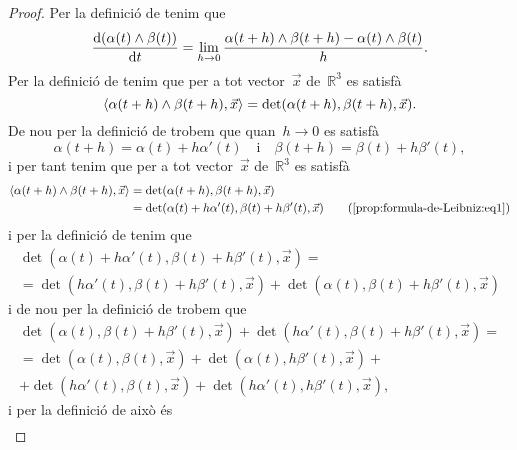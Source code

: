 \documentclass[../../main.tex]{subfiles}
\begin{document}
    \begin{proof}
        Per la definició de  tenim que
        \begin{equation}
            \label{prop:formula-de-Leibniz:eq2}
            \frac{\mathop{}\!\mathrm{d}(\alpha(t)\mathbin{\wedge}\beta(t))}{\mathop{}\!\mathrm{d} t}=\lim_{h\to0}\frac{\alpha(t+h)\mathbin{\wedge}\beta(t+h)-\alpha(t)\mathbin{\wedge}\beta(t)}{h}.
        \end{equation}
        Per la definició de  tenim que per a tot vector~\(\vec{x}\) de~\(\mathbb{R}^{3}\) es satisfà
        \[
            \prodesc{\alpha(t+h)\prodvec\beta(t+h)}{\vec{x}}=\det(\alpha(t+h),\beta(t+h),\vec{x}).
        \]
        De nou per la definició de  trobem que quan~\(h\to0\) es satisfà
        \begin{equation}
            \label{prop:formula-de-Leibniz:eq1}
            \alpha(t+h)=\alpha(t)+h\alpha'(t)\quad\text{i}\quad\beta(t+h)=\beta(t)+h\beta'(t),
        \end{equation}
        i per tant tenim que per a tot vector~\(\vec{x}\) de~\(\mathbb{R}^{3}\) es satisfà
        \begin{align*}
            \prodesc{\alpha(t+h)\prodvec\beta(t+h)}{\vec{x}}&=\det(\alpha(t+h),\beta(t+h),\vec{x}) \\
            &=\det(\alpha(t)+h\alpha'(t),\beta(t)+h\beta'(t),\vec{x}) \tag{\ref{prop:formula-de-Leibniz:eq1}}
        \end{align*}
        i per la definició de  tenim que
        \begin{multline*}
            \det(\alpha(t)+h\alpha'(t),\beta(t)+h\beta'(t),\vec{x})=\\
            =\det(h\alpha'(t),\beta(t)+h\beta'(t),\vec{x})+\det(\alpha(t),\beta(t)+h\beta'(t),\vec{x})
        \end{multline*}
        i de nou per la definició de  trobem que
        \begin{multline*}
            \det(\alpha(t),\beta(t)+h\beta'(t),\vec{x})+\det(h\alpha'(t),\beta(t)+h\beta'(t),\vec{x})=\\
            =\det(\alpha(t),\beta(t),\vec{x})+\det(\alpha(t),h\beta'(t),\vec{x})+\\
            +\det(h\alpha'(t),\beta(t),\vec{x})+\det(h\alpha'(t),h\beta'(t),\vec{x}),
        \end{multline*}
        i per la definició de  això és
        \begin{multline*}

\end{multline*}
\end{proof}
\end{document}
